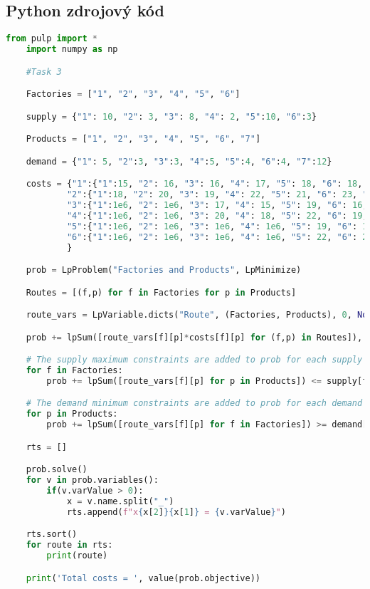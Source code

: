 \documentclass{article}%
\begin{document}
\subsection{Python zdrojový kód}
\begin{lstlisting}[language=Python, showstringspaces=false, basicstyle=\tiny]
    from pulp import *
    import numpy as np

    #Task 3

    Factories = ["1", "2", "3", "4", "5", "6"]

    supply = {"1": 10, "2": 3, "3": 8, "4": 2, "5":10, "6":3}

    Products = ["1", "2", "3", "4", "5", "6", "7"]

    demand = {"1": 5, "2":3, "3":3, "4":5, "5":4, "6":4, "7":12}

    costs = {"1":{"1":15, "2": 16, "3": 16, "4": 17, "5": 18, "6": 18, "7": 0 },
            "2":{"1":18, "2": 20, "3": 19, "4": 22, "5": 21, "6": 23, "7": 0 },
            "3":{"1":1e6, "2": 1e6, "3": 17, "4": 15, "5": 19, "6": 16, "7": 0 },
            "4":{"1":1e6, "2": 1e6, "3": 20, "4": 18, "5": 22, "6": 19, "7": 0 },
            "5":{"1":1e6, "2": 1e6, "3": 1e6, "4": 1e6, "5": 19, "6": 17, "7": 0 },
            "6":{"1":1e6, "2": 1e6, "3": 1e6, "4": 1e6, "5": 22, "6": 22, "7": 0 }
            }

    prob = LpProblem("Factories and Products", LpMinimize)

    Routes = [(f,p) for f in Factories for p in Products]

    route_vars = LpVariable.dicts("Route", (Factories, Products), 0, None, LpInteger)

    prob += lpSum([route_vars[f][p]*costs[f][p] for (f,p) in Routes]), "Sum of Transporting Costs"

    # The supply maximum constraints are added to prob for each supply node (warehouse)
    for f in Factories:
        prob += lpSum([route_vars[f][p] for p in Products]) <= supply[f], "Sum of Products out of Plants %s"%f

    # The demand minimum constraints are added to prob for each demand node (bar)
    for p in Products:
        prob += lpSum([route_vars[f][p] for f in Factories]) >= demand[p], "Sum of Products into Warehouses %s"%p

    rts = []

    prob.solve()
    for v in prob.variables():
        if(v.varValue > 0):
            x = v.name.split("_")
            rts.append(f"x{x[2]}{x[1]} = {v.varValue}")

    rts.sort()
    for route in rts:
        print(route)

    print('Total costs = ', value(prob.objective))
\end{lstlisting}
\end{document}
